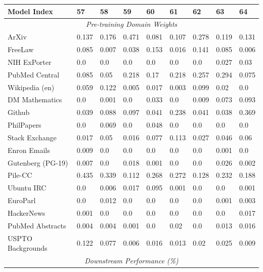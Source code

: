 \documentclass{article}
\theoremstyle{definition}
\theoremstyle{remark}
\begin{document}
\begin{table}[!ht]
    \centering
    \begin{tabular}{lllllllll}
    \toprule
        \textbf{Model Index} & \textbf{57} & \textbf{58} & \textbf{59} & \textbf{60} & \textbf{61} & \textbf{62} & \textbf{63} & \textbf{64} \\ \midrule
        \multicolumn{9}{c}{\textit{Pre-training Domain Weights}} \\
        ArXiv & 0.137 & 0.176 & 0.471 & 0.081 & 0.107 & 0.278 & 0.119 & 0.131 \\ 
        FreeLaw & 0.085 & 0.007 & 0.038 & 0.153 & 0.016 & 0.141 & 0.085 & 0.006 \\ 
        NIH ExPorter & 0.0 & 0.0 & 0.0 & 0.0 & 0.0 & 0.0 & 0.027 & 0.03 \\ 
        PubMed Central & 0.085 & 0.05 & 0.218 & 0.17 & 0.218 & 0.257 & 0.294 & 0.075 \\ 
        Wikipedia (en) & 0.059 & 0.122 & 0.005 & 0.017 & 0.003 & 0.099 & 0.02 & 0.0 \\ 
        DM Mathematics & 0.0 & 0.001 & 0.0 & 0.033 & 0.0 & 0.009 & 0.073 & 0.093 \\ 
        Github & 0.039 & 0.088 & 0.097 & 0.041 & 0.238 & 0.041 & 0.038 & 0.369 \\ 
        PhilPapers & 0.0 & 0.069 & 0.0 & 0.048 & 0.0 & 0.0 & 0.0 & 0.0 \\ 
        Stack Exchange & 0.017 & 0.05 & 0.016 & 0.077 & 0.113 & 0.027 & 0.046 & 0.06 \\ 
        Enron Emails & 0.009 & 0.0 & 0.0 & 0.0 & 0.0 & 0.0 & 0.001 & 0.0 \\ 
        Gutenberg (PG-19) & 0.007 & 0.0 & 0.018 & 0.001 & 0.0 & 0.0 & 0.026 & 0.002 \\ 
        Pile-CC & 0.435 & 0.339 & 0.112 & 0.268 & 0.272 & 0.128 & 0.232 & 0.188 \\ 
        Ubuntu IRC & 0.0 & 0.006 & 0.017 & 0.095 & 0.001 & 0.0 & 0.0 & 0.001 \\ 
        EuroParl & 0.0 & 0.012 & 0.0 & 0.0 & 0.0 & 0.0 & 0.001 & 0.003 \\ 
        HackerNews & 0.001 & 0.0 & 0.0 & 0.0 & 0.0 & 0.0 & 0.0 & 0.017 \\ 
        PubMed Abstracts & 0.004 & 0.004 & 0.001 & 0.0 & 0.02 & 0.0 & 0.013 & 0.016 \\ 
        USPTO Backgrounds & 0.122 & 0.077 & 0.006 & 0.016 & 0.013 & 0.02 & 0.025 & 0.009 \\ 
        \midrule
        \multicolumn{9}{c}{\textit{Downstream Performance (\%)}} \\

\end{tabular}
\end{table}
\end{document}
